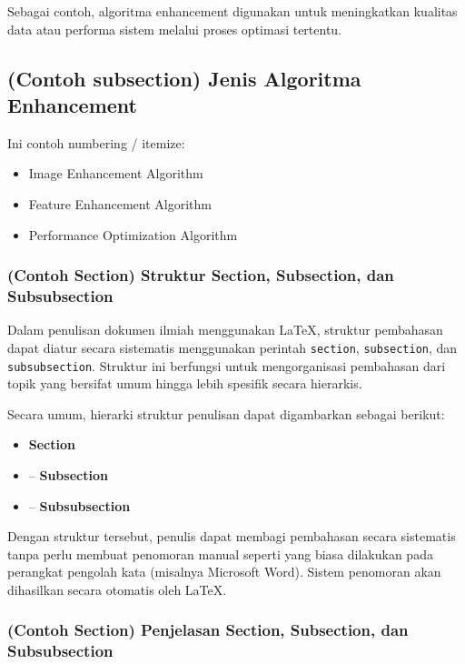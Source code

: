 Sebagai contoh, algoritma enhancement digunakan untuk meningkatkan kualitas
data atau performa sistem melalui proses optimasi tertentu.

\subsection{(Contoh subsection) Jenis Algoritma Enhancement}

Ini contoh numbering / itemize:

\begin{itemize}
\item Image Enhancement Algorithm
\item Feature Enhancement Algorithm
\item Performance Optimization Algorithm
\end{itemize}

\subsubsection{(Contoh Section) Struktur Section, Subsection, dan Subsubsection}

Dalam penulisan dokumen ilmiah menggunakan \LaTeX, struktur pembahasan dapat
diatur secara sistematis menggunakan perintah \texttt{section},
\texttt{subsection}, dan \texttt{subsubsection}. Struktur ini berfungsi untuk
mengorganisasi pembahasan dari topik yang bersifat umum hingga lebih spesifik
secara hierarkis.

Secara umum, hierarki struktur penulisan dapat digambarkan sebagai berikut:

\begin{itemize}
\item \textbf{Section}
\item \quad -- \textbf{Subsection}
\item \quad \quad -- \textbf{Subsubsection}
\end{itemize}

Dengan struktur tersebut, penulis dapat membagi pembahasan secara sistematis
tanpa perlu membuat penomoran manual seperti yang biasa dilakukan pada
perangkat pengolah kata (misalnya Microsoft Word). Sistem penomoran akan
dihasilkan secara otomatis oleh \LaTeX.

\subsubsection{(Contoh Section) Penjelasan Section, Subsection, dan Subsubsection}

